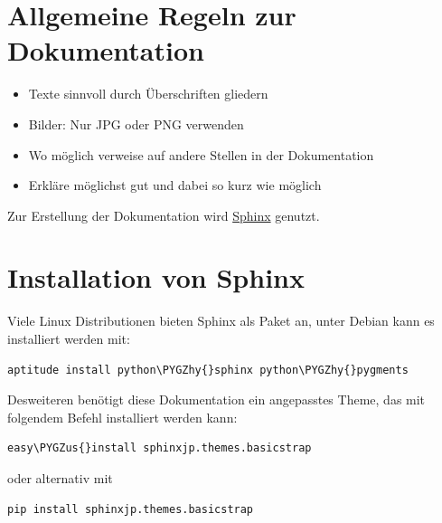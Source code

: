 \documentclass[a4paper,12pt,ngerman]{sphinxmanual}
\def\PYGZus{\char`\_}
\def\PYGZhy{\char`\-}
\begin{document}
\section{Allgemeine Regeln zur Dokumentation}
\label{help-with-documentation:allgemeine-regeln-zur-dokumentation}\begin{itemize}
\item {} 
Texte sinnvoll durch Überschriften gliedern

\item {} 
Bilder: Nur JPG oder PNG verwenden

\item {} 
Wo möglich verweise auf andere Stellen in der Dokumentation

\item {} 
Erkläre möglichst gut und dabei so kurz wie möglich

\end{itemize}

Zur Erstellung der Dokumentation wird \href{http://sphinx-doc.org}{Sphinx} genutzt.


\section{Installation von Sphinx}
\label{help-with-documentation:installation-von-sphinx}
Viele Linux Distributionen bieten Sphinx als Paket an, unter Debian kann es
installiert werden mit:

\begin{Verbatim}[commandchars=\\\{\}]
aptitude install python\PYGZhy{}sphinx python\PYGZhy{}pygments
\end{Verbatim}

Desweiteren benötigt diese Dokumentation ein angepasstes Theme, das mit
folgendem Befehl installiert werden kann:

\begin{Verbatim}[commandchars=\\\{\}]
easy\PYGZus{}install sphinxjp.themes.basicstrap
\end{Verbatim}

oder alternativ mit

\begin{Verbatim}[commandchars=\\\{\}]
pip install sphinxjp.themes.basicstrap
\end{Verbatim}



\renewcommand{\indexname}{Stichwortverzeichnis}
\printindex
\end{document}

